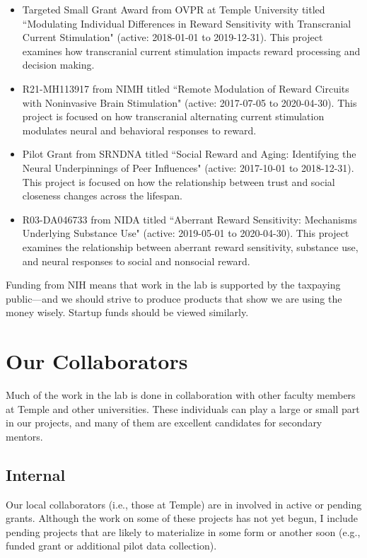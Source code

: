 \documentclass[letterpaper,12pt,oneside]{memoir}
\begin{document}
\begin{itemize}
\item Targeted Small Grant Award from OVPR at Temple University titled ``Modulating Individual Differences in Reward Sensitivity with Transcranial Current Stimulation" (active: 2018-01-01 to 2019-12-31). This project examines how transcranial current stimulation impacts reward processing and decision making.
\item R21-MH113917 from NIMH titled ``Remote Modulation of Reward Circuits with Noninvasive Brain Stimulation" (active: 2017-07-05 to 2020-04-30). This project is focused on how transcranial alternating current stimulation modulates neural and behavioral responses to reward. 
\item Pilot Grant from SRNDNA titled ``Social Reward and Aging: Identifying the Neural Underpinnings of Peer Influences" (active: 2017-10-01 to 2018-12-31). This project is focused on how the relationship between trust and social closeness changes across the lifespan. 
\item R03-DA046733 from NIDA titled ``Aberrant Reward Sensitivity: Mechanisms Underlying Substance Use" (active: 2019-05-01 to 2020-04-30). This project examines the relationship between aberrant reward sensitivity, substance use, and neural responses to social and nonsocial reward. 
\end{itemize}

Funding from NIH means that work in the lab is supported by the taxpaying public---and we should strive to produce products that show we are using the money wisely. Startup funds should be viewed similarly. 


\section{Our Collaborators}

Much of the work in the lab is done in collaboration with other faculty members at Temple and other universities. These individuals can play a large or small part in our projects, and many of them are excellent candidates for secondary mentors. 

\subsection{Internal}

Our local collaborators (i.e., those at Temple) are in involved in active or pending grants. Although the work on some of these projects has not yet begun, I include pending projects that are likely to materialize in some form or another soon (e.g., funded grant or additional pilot data collection).
\end{document}
